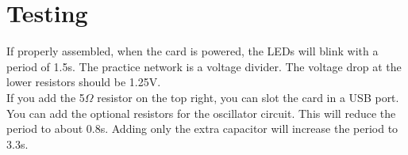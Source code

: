\documentclass{article}
\begin{document}
\section{Testing}
If properly assembled, when the card is powered, the LEDs will blink with a period of 1.5s. The practice network is a voltage divider. The voltage drop at the lower resistors should be 1.25V.\\
If you add the 5$\Omega$ resistor on the top right, you can slot the card in a USB port.\\
You can add the optional resistors for the oscillator circuit. This will reduce the period to about 0.8s. Adding only the extra capacitor will increase the period to 3.3s.
\end{document}
